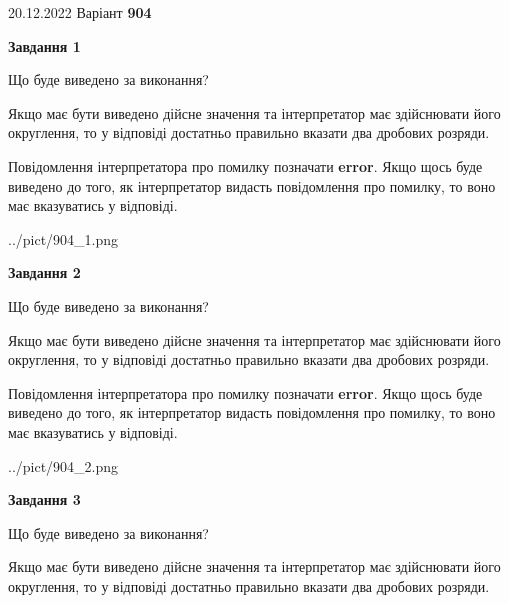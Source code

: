 \documentclass[12pt, ukrainian]{article}
\begin{document}
{20.12.2022 Варіант \No \textbf { 904 }\par}
{
\begin {Large}

{\begin {center}\textbf{Завдання 1}\end {center}}\par
Що буде виведено за виконання? \par

Якщо має бути виведено дійсне значення та інтерпретатор має здійснювати його округлення, 
то у відповіді достатньо правильно вказати два дробових розряди.

Повідомлення інтерпретатора про помилку позначати \textbf{error}.
Якщо щось буде виведено до того, як інтерпретатор видасть повідомлення про помилку, 
то воно має вказуватись у відповіді. \par

\begin{center}
	{../pict/904_1.png}
\end{center}
\newpage

{\begin {center}\textbf{Завдання 2}\end {center}}\par
Що буде виведено за виконання? \par

Якщо має бути виведено дійсне значення та інтерпретатор має здійснювати його округлення, 
то у відповіді достатньо правильно вказати два дробових розряди.

Повідомлення інтерпретатора про помилку позначати \textbf{error}.
Якщо щось буде виведено до того, як інтерпретатор видасть повідомлення про помилку, 
то воно має вказуватись у відповіді. \par

\begin{center}
	{../pict/904_2.png}
\end{center}
\newpage

{\begin {center}\textbf{Завдання 3}\end {center}}\par
Що буде виведено за виконання? \par

Якщо має бути виведено дійсне значення та інтерпретатор має здійснювати його округлення, 
то у відповіді достатньо правильно вказати два дробових розряди.


\end{Large}}
\end{document}

